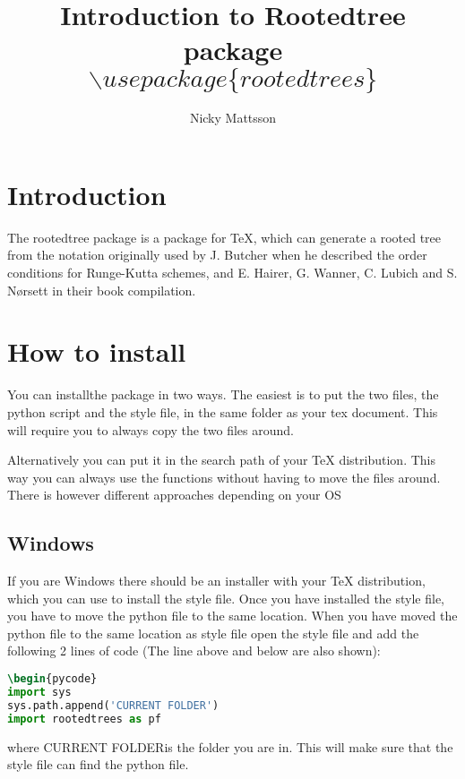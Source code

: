 \documentclass[11pt,a4paper]{article}
\author{Nicky Mattsson}
\title{Introduction to Rootedtree package \\$\backslash usepackage\{ rootedtrees\}$}
\begin{document}
\maketitle
\newpage
\section{Introduction}
The rootedtree package is a package for TeX, which can generate a rooted tree from the notation originally used by J. Butcher when he described the order conditions for Runge-Kutta schemes, and E. Hairer, G. Wanner, C. Lubich and S. Nørsett in their book compilation. 

\section{How to install}
You can \glqq install\grqq the package in two ways. The easiest is to put the two files, the python script and the style file, in the same folder as your tex document. This will require you to always copy the two files around.

Alternatively you can put it in the search path of your TeX distribution. This way you can always use the functions without having to move the files around. There is however different approaches depending on your OS

\subsection{Windows}
If you are Windows there should be an installer with your TeX distribution, which you can use to install the style file. Once you have installed the style file, you have to move the python file to the same location. When you have moved the python file to the same location as style file open the style file and add the following 2 lines of code (The line above and below are also shown):
\begin{lstlisting}[language={TeX}]
\begin{pycode}
import sys
sys.path.append('CURRENT FOLDER')
import rootedtrees as pf
\end{lstlisting}
where \glqq CURRENT FOLDER\grqq is the folder you are in. This will make sure that the style file can find the python file.
\end{document}

